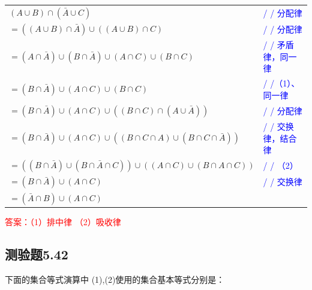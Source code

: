 \documentclass[UTF8, heading=true]{ctexart}
\begin{document}
\begin{table}[H]
  \centering
  \renewcommand{\arraystretch}{1.5}
  \begin{tabular}{ll}
    $(A \cup B) \cap (\bar{A} \cup C)$ & \textcolor{blue}{/ / 分配律} \\
    $=((A \cup B) \cap \bar{A}) \cup ((A \cup B) \cap C)$ & \textcolor{blue}{/ / 分配律} \\
    $=(A \cap \bar{A}) \cup (B \cap \bar{A}) \cup (A \cap C) \cup (B \cap C)$ & \textcolor{blue}{/ / 矛盾律，同一律} \\
    $=(B \cap \bar{A}) \cup (A \cap C) \cup (B \cap C)$ & \textcolor{blue}{/ /（1）、 同一律} \\
    $=(B \cap \bar{A}) \cup (A \cap C) \cup ((B \cap C) \cap (A \cup \bar{A}))$ & \textcolor{blue}{/ / 分配律} \\
    $=(B \cap \bar{A}) \cup (A \cap C) \cup ((B \cap C \cap A) \cup (B \cap C \cap \bar{A}))$ & \textcolor{blue}{/ / 交换律，结合律} \\
    $=((B \cap \bar{A}) \cup (B \cap \bar{A} \cap C)) \cup ((A \cap C) \cup (B \cap A \cap C))$ & \textcolor{blue}{/ / （2）} \\
    $=(B \cap \bar{A}) \cup (A \cap C)$ & \textcolor{blue}{/ / 交换律} \\
    $=(\bar{A} \cap B) \cup (A \cap C)$ & \\
  \end{tabular}
\end{table}



\textcolor{red}{答案：（1）排中律 （2）吸收律}

\subsection{测验题5.42}

下面的集合等式演算中 (1),(2)使用的集合基本等式分别是：

\end{document}
